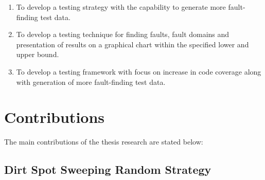 \begin{enumerate}
\item To develop a testing strategy with the capability to generate more fault-finding test data.

\item To develop a testing technique for finding faults, fault domains and presentation of results on a graphical chart within the specified lower and upper bound. 

\item To develop a testing framework with focus on increase in code coverage along with generation of more fault-finding test data. 

\end{enumerate}

\section{Contributions}
The main contributions of the thesis research are stated below: 

\subsection{Dirt Spot Sweeping Random Strategy}

